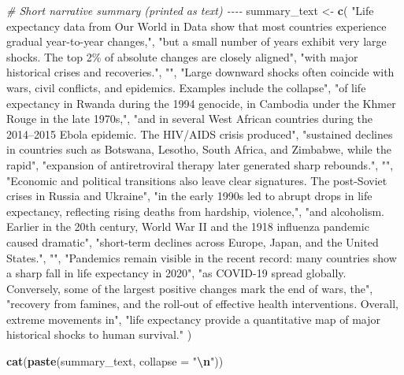 \documentclass[
  11pt,
]{article}
\newenvironment{Shaded}{\begin{snugshade}}{\end{snugshade}}
\newcommand{\AttributeTok}[1]{\textcolor[rgb]{0.13,0.29,0.53}{#1}}
\newcommand{\CommentTok}[1]{\textcolor[rgb]{0.56,0.35,0.01}{\textit{#1}}}
\newcommand{\FunctionTok}[1]{\textcolor[rgb]{0.13,0.29,0.53}{\textbf{#1}}}
\newcommand{\NormalTok}[1]{#1}
\newcommand{\OtherTok}[1]{\textcolor[rgb]{0.56,0.35,0.01}{#1}}
\newcommand{\SpecialCharTok}[1]{\textcolor[rgb]{0.81,0.36,0.00}{\textbf{#1}}}
\newcommand{\StringTok}[1]{\textcolor[rgb]{0.31,0.60,0.02}{#1}}
\begin{document}
\begin{Shaded}
\begin{Highlighting}[]
\CommentTok{\# Short narrative summary (printed as text) {-}{-}{-}{-}}
\NormalTok{summary\_text }\OtherTok{\textless{}{-}} \FunctionTok{c}\NormalTok{(}
  \StringTok{"Life expectancy data from Our World in Data show that most countries experience gradual year{-}to{-}year changes,"}\NormalTok{,}
  \StringTok{"but a small number of years exhibit very large shocks. The top 2\% of absolute changes are closely aligned"}\NormalTok{,}
  \StringTok{"with major historical crises and recoveries."}\NormalTok{,}
  \StringTok{""}\NormalTok{,}
  \StringTok{"Large downward shocks often coincide with wars, civil conflicts, and epidemics. Examples include the collapse"}\NormalTok{,}
  \StringTok{"of life expectancy in Rwanda during the 1994 genocide, in Cambodia under the Khmer Rouge in the late 1970s,"}\NormalTok{,}
  \StringTok{"and in several West African countries during the 2014–2015 Ebola epidemic. The HIV/AIDS crisis produced"}\NormalTok{,}
  \StringTok{"sustained declines in countries such as Botswana, Lesotho, South Africa, and Zimbabwe, while the rapid"}\NormalTok{,}
  \StringTok{"expansion of antiretroviral therapy later generated sharp rebounds."}\NormalTok{,}
  \StringTok{""}\NormalTok{,}
  \StringTok{"Economic and political transitions also leave clear signatures. The post{-}Soviet crises in Russia and Ukraine"}\NormalTok{,}
  \StringTok{"in the early 1990s led to abrupt drops in life expectancy, reflecting rising deaths from hardship, violence,"}\NormalTok{,}
  \StringTok{"and alcoholism. Earlier in the 20th century, World War II and the 1918 influenza pandemic caused dramatic"}\NormalTok{,}
  \StringTok{"short{-}term declines across Europe, Japan, and the United States."}\NormalTok{,}
  \StringTok{""}\NormalTok{,}
  \StringTok{"Pandemics remain visible in the recent record: many countries show a sharp fall in life expectancy in 2020"}\NormalTok{,}
  \StringTok{"as COVID{-}19 spread globally. Conversely, some of the largest positive changes mark the end of wars, the"}\NormalTok{,}
  \StringTok{"recovery from famines, and the roll{-}out of effective health interventions. Overall, extreme movements in"}\NormalTok{,}
  \StringTok{"life expectancy provide a quantitative map of major historical shocks to human survival."}
\NormalTok{)}

\FunctionTok{cat}\NormalTok{(}\FunctionTok{paste}\NormalTok{(summary\_text, }\AttributeTok{collapse =} \StringTok{"}\SpecialCharTok{\textbackslash{}n}\StringTok{"}\NormalTok{))}
\end{Highlighting}
\end{Shaded}
\end{document}
